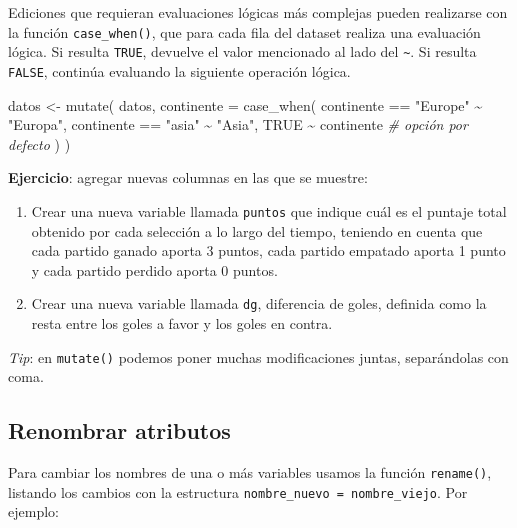 \documentclass[
]{book}
\newenvironment{Shaded}{\begin{snugshade}}{\end{snugshade}}
\newcommand{\AttributeTok}[1]{\textcolor[rgb]{0.77,0.63,0.00}{#1}}
\newcommand{\CommentTok}[1]{\textcolor[rgb]{0.56,0.35,0.01}{\textit{#1}}}
\newcommand{\ConstantTok}[1]{\textcolor[rgb]{0.00,0.00,0.00}{#1}}
\newcommand{\FunctionTok}[1]{\textcolor[rgb]{0.00,0.00,0.00}{#1}}
\newcommand{\NormalTok}[1]{#1}
\newcommand{\OtherTok}[1]{\textcolor[rgb]{0.56,0.35,0.01}{#1}}
\newcommand{\SpecialCharTok}[1]{\textcolor[rgb]{0.00,0.00,0.00}{#1}}
\newcommand{\StringTok}[1]{\textcolor[rgb]{0.31,0.60,0.02}{#1}}
\begin{document}
Ediciones que requieran evaluaciones lógicas más complejas pueden realizarse con la función \texttt{case\_when()}, que para cada fila del dataset realiza una evaluación lógica. Si resulta \texttt{TRUE}, devuelve el valor mencionado al lado del \texttt{\textasciitilde{}}. Si resulta \texttt{FALSE}, continúa evaluando la siguiente operación lógica.

\begin{Shaded}
\begin{Highlighting}[]
\NormalTok{datos }\OtherTok{\textless{}{-}} \FunctionTok{mutate}\NormalTok{(}
\NormalTok{    datos, }
    \AttributeTok{continente =} \FunctionTok{case\_when}\NormalTok{(}
\NormalTok{        continente }\SpecialCharTok{==} \StringTok{"Europe"} \SpecialCharTok{\textasciitilde{}} \StringTok{"Europa"}\NormalTok{,}
\NormalTok{        continente }\SpecialCharTok{==} \StringTok{"asia"} \SpecialCharTok{\textasciitilde{}} \StringTok{"Asia"}\NormalTok{,}
        \ConstantTok{TRUE} \SpecialCharTok{\textasciitilde{}}\NormalTok{ continente }\CommentTok{\# opción por defecto}
\NormalTok{        )}
\NormalTok{    )}
\end{Highlighting}
\end{Shaded}

\textbf{Ejercicio}: agregar nuevas columnas en las que se muestre:

\begin{enumerate}
\def\labelenumi{\alph{enumi})}
\item
  Crear una nueva variable llamada \texttt{puntos} que indique cuál es el puntaje total obtenido por cada selección a lo largo del tiempo, teniendo en cuenta que cada partido ganado aporta 3 puntos, cada partido empatado aporta 1 punto y cada partido perdido aporta 0 puntos.
\item
  Crear una nueva variable llamada \texttt{dg}, diferencia de goles, definida como la resta entre los goles a favor y los goles en contra.
\end{enumerate}

\emph{Tip}: en \texttt{mutate()} podemos poner muchas modificaciones juntas, separándolas con coma.

\hypertarget{renombrar-atributos}{%
\subsection{Renombrar atributos}\label{renombrar-atributos}}

Para cambiar los nombres de una o más variables usamos la función \texttt{rename()}, listando los cambios con la estructura \texttt{nombre\_nuevo\ =\ nombre\_viejo}. Por ejemplo:
\end{document}
